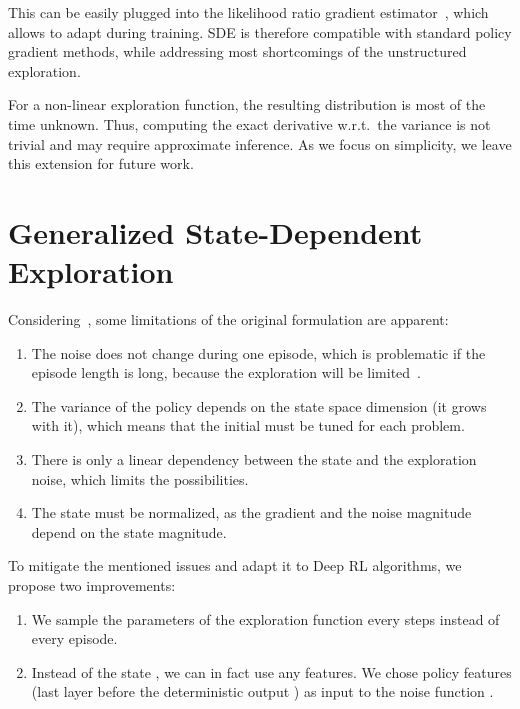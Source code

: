 \documentclass{article}
\newcommand{\sde}{State-Dependent Exploration\xspace}
\newcommand{\SDE}{\textsc{SDE}\xspace}
\begin{document}
This can be easily plugged into the likelihood ratio gradient estimator~\citep{williams1992simple}, which allows to adapt  during training.
\SDE is therefore compatible with standard policy gradient methods, while addressing most shortcomings of the unstructured exploration.

For a non-linear exploration function, the resulting distribution  is most of the time unknown. Thus, computing the exact derivative w.r.t.\ the variance is not trivial and may require approximate inference. As we focus on simplicity, we leave this extension for future work.

\section{Generalized \sde}
\label{sec:gsde}

Considering~, some limitations of the original formulation are apparent:
\begin{enumerate}[label=\roman*]
  \item The noise does not change during one episode, which is problematic if the episode length is long, because the exploration will be limited~\citep{hoof2017generalized}. \label{item:episode-sampling}
  \item The variance of the policy  depends on the state space dimension (it grows with it), which means that the initial  must be tuned for each problem. \label{item:variance-task}
  \item There is only a linear dependency between the state and the exploration noise, which limits the possibilities. \label{item:linear-noise}
  \item The state must be normalized, as the gradient and the noise magnitude depend on the state magnitude. \label{item:gradient-issue}
\end{enumerate}

To mitigate the mentioned issues and adapt it to Deep RL algorithms, we propose two improvements:
\begin{enumerate}
  \item We sample the parameters  of the exploration function every  steps instead of every episode. \label{item:n-steps}
  \item Instead of the state , we can in fact use any features. We chose policy features  (last layer before the deterministic output ) as input to the noise function . \label{item:features}
\end{enumerate}
\end{document}
